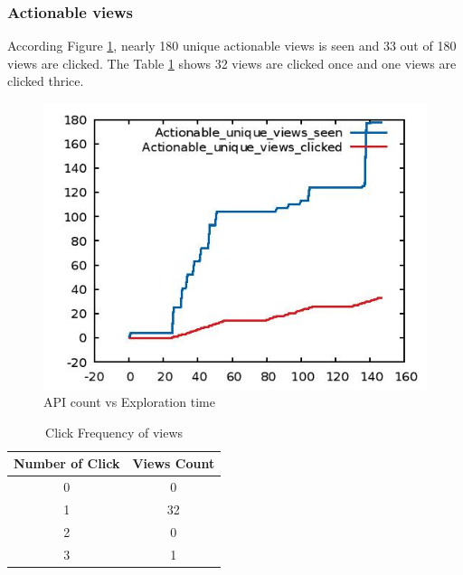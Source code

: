 \subsubsection{Actionable views}
According Figure \ref{fig:bp4}, nearly 180 unique actionable views is seen and 33 out of 180 views are clicked. The Table \ref{table:1} shows 32 views are clicked once and one views are clicked thrice. 
\begin{figure}[!h]
  \centering
  \includegraphics [scale=1.4] {bp4.jpg}
  \caption{API count vs Exploration time}
  \label{fig:bp4}
\end{figure}

\begin{table}[h!]
\centering
\begin{tabular}{||c | c||} 
 \hline
 Number of Click & Views Count \\ [0.5ex] 
 \hline\hline
 0 & 0 \\ 
 1 & 32\\
 2 & 0 \\
 3 & 1\\ [1ex] 

 \hline
\end{tabular}
\caption{Click Frequency of views}

\label{table:1}
\end{table}

